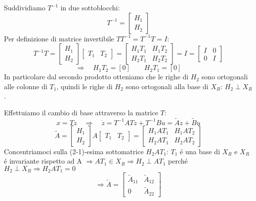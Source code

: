 \documentclass[../main.tex]{subfiles}
\begin{document}
		Suddividiamo $ T^{-1} $ in due sottoblocchi:
		\[
			T^{-1} =
			\begin{bmatrix}
				H_1\\
				H_2
			\end{bmatrix}
		\]
		Per definizione di matrice invertibile $ T T^{-1} = T^{-1} T = I $:
		\[
			T^{-1} T =
			\begin{bmatrix}
				H_1\\
				H_2
			\end{bmatrix}
			\begin{bmatrix}
				T_1 & T_2
			\end{bmatrix} =
			\begin{bmatrix}
				H_1 T_1 & H_1 T_2\\
				H_2 T_1 & H_2 T_2 
			\end{bmatrix} = I =
			\begin{bmatrix}
				I & 0\\
				0 & I
			\end{bmatrix}
		\]
		\[
			\Rightarrow\quad H_1 T_2 = [0] \qquad H_2 T_1 = [0]
		\]
		In particolare dal secondo prodotto otteniamo che le righe di $ H_2 $ sono ortogonali alle colonne di $ T_1 $, quindi le righe di $ H_2 $ sono ortogonali alla base di $ X_R $: $ H_2 \perp X_R $.
		\newline
		
		Effettuiamo il cambio di base attraverso la matrice $ T $:
		\[
			x = Tz \quad\Rightarrow\quad \dot z = T^{-1}AT z + T^{-1} B u = \tilde A z + \tilde B u
		\]
		\[
			\tilde A =
			\begin{bmatrix}
				H_1\\
				H_2
			\end{bmatrix} A
			\begin{bmatrix}
				T_1 & T_2
			\end{bmatrix} =
			\begin{bmatrix}
				H_1 A T_1 & H_1 A T_2\\
				H_2 A T_1 & H_2 A T_2
			\end{bmatrix}
		\]
		Concentriamoci sulla (2-1)-esima sottomatrice $ H_2 A T_1 $: $ T_1 $ \'e una base di $ X_R $ e $ X_R $ \'e invariante rispetto ad A $ \Rightarrow AT_1 \in X_R \Rightarrow H_2 \perp AT_1 $ perch\'e $ H_2 \perp X_R \Rightarrow H_2 A T_1 = 0 $
		\[
			\Rightarrow \tilde A = \begin{bmatrix}
				\tilde A_{11} & \tilde A_{12}\\
				0 & \tilde A_{22}
			\end{bmatrix}
		\]
		
\end{document}

